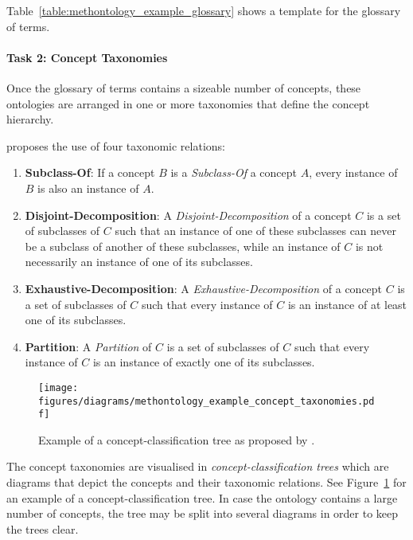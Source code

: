 Table~\ref{table:methontology_example_glossary} shows a template for the glossary of terms.

\paragraph{Task 2: Concept Taxonomies}

Once the glossary of terms contains a sizeable number of concepts, these ontologies are arranged in one or more taxonomies that define the concept hierarchy.

\methontology proposes the use of four taxonomic relations:
\begin{enumerate}
  \item \textbf{Subclass-Of}: If a concept $B$ is a \emph{Subclass-Of} a concept $A$, every instance of $B$ is also an instance of $A$.
  \item \textbf{Disjoint-Decomposition}: A \emph{Disjoint-Decomposition} of a concept $C$ is a set of subclasses of $C$ such that an instance of one of these subclasses can never be a subclass of another of these subclasses, while an instance of $C$ is not necessarily an instance of one of its subclasses.
  \item \textbf{Exhaustive-Decomposition}: A \emph{Exhaustive-Decomposition} of a concept $C$ is a set of subclasses of $C$ such that every instance of $C$ is an instance of at least one of its subclasses.
  \item \textbf{Partition}: A \emph{Partition} of $C$ is a set of subclasses of $C$ such that every instance of $C$ is an instance of exactly one of its subclasses.
\end{enumerate}

\begin{figure}
\centering
\texttt{[image: figures/diagrams/methontology\_example\_concept\_taxonomies.pdf]}
\caption[Example of a concept-classification tree]{Example of a concept-classification tree as proposed by \methontology.}
\label{fig:methontology_example_concept_taxonomies}
\end{figure}

The concept taxonomies are visualised in \emph{concept-classification trees} which are diagrams that depict the concepts and their taxonomic relations. See Figure~\ref{fig:methontology_example_concept_taxonomies} for an example of a concept-classification tree. In case the ontology contains a large number of concepts, the tree may be split into several diagrams in order to keep the trees clear.


